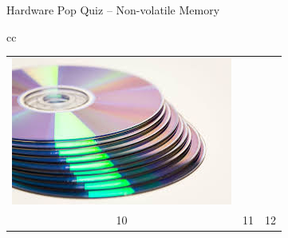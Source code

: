 \documentclass[compress,11pt,xcolor=svgnames,aspectratio=169]{beamer}
\begin{document}
\begin{frame}[t]{Hardware Pop Quiz -- Non-volatile Memory}
\begin{center}
\begin{tabular}{cc}
\begin{tabular}{ccc}
\includegraphics[scale=0.15]{fig/cd} \\
10 & 11 & 12 \\
\end{tabular}

\end{tabular}

\end{center}

\end{frame}
\end{document}
